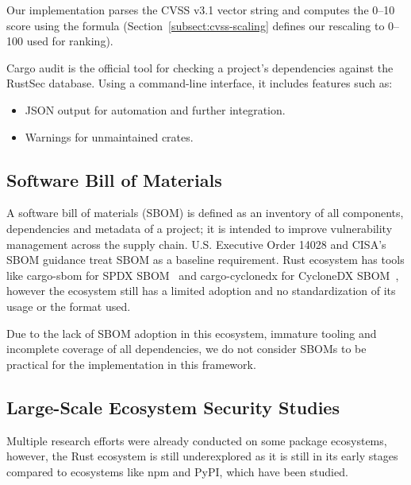 Our implementation parses the CVSS v3.1 vector string and computes the 0--10 score using the formula (Section~\ref{subsect:cvss-scaling} defines our rescaling to 0--100 used for ranking).

Cargo audit is the official tool for checking a project's dependencies against the RustSec database. Using a command-line interface, it includes features such as:
\begin{itemize}
	\item JSON output for automation and further integration.
	\item Warnings for unmaintained crates.
\end{itemize}


\subsection{Software Bill of Materials}\label{sect:software-bill-of-materials}
A software bill of materials (SBOM) is defined as an inventory of all components, dependencies and metadata of a project; it is intended to improve vulnerability management across the supply chain. U.S. Executive Order 14028 and CISA's SBOM guidance treat SBOM as a baseline requirement. Rust ecosystem has tools like cargo-sbom for SPDX SBOM~\cite{spdx2024} and cargo-cyclonedx for CycloneDX SBOM~\cite{owasp2024}, however the ecosystem still has a limited adoption and no standardization of its usage or the format used.

Due to the lack of SBOM adoption in this ecosystem, immature tooling and incomplete coverage of all dependencies, we do not consider SBOMs to be practical for the implementation in this framework.

\subsection{Large-Scale Ecosystem Security Studies}\label{sect:large-scale-studies}

Multiple research efforts were already conducted on some package ecosystems, however, the Rust ecosystem is still underexplored as it is still in its early stages compared to ecosystems like npm and PyPI, which have been studied.

